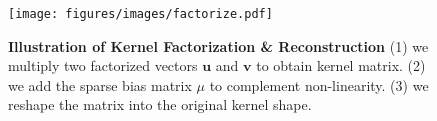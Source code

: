 \begin{figure}
\small
    \centering
    \texttt{[image: figures/images/factorize.pdf]} 
    \vspace{-0.05in}
    \caption{\small{\textbf{Illustration of Kernel Factorization \& Reconstruction}} (1) we multiply two factorized vectors $\textbf{u}$ and $\textbf{v}$ to obtain kernel matrix. (2) we add the sparse bias matrix $\mu$ to complement non-linearity. (3) we reshape the matrix into the original kernel shape. }
    \label{fig:factorize_detail}
    \vspace{-0.3in}
\end{figure}



